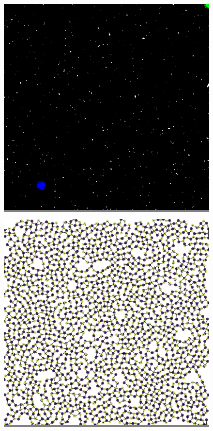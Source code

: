 \documentclass{article}
\begin{document}
\begin{figure}
    \begin{minipage}{0.3\textwidth}
    \colorbox{gray}{\includegraphics[width=\linewidth]{./images/square_4.png}}
    \end{minipage}
    \hspace{\fill}
    \begin{minipage}{0.3\textwidth}
    \colorbox{gray}{\includegraphics[width=\linewidth]{./images/square_4_bb_0.png}}

\end{minipage}
\end{figure}
\end{document}
